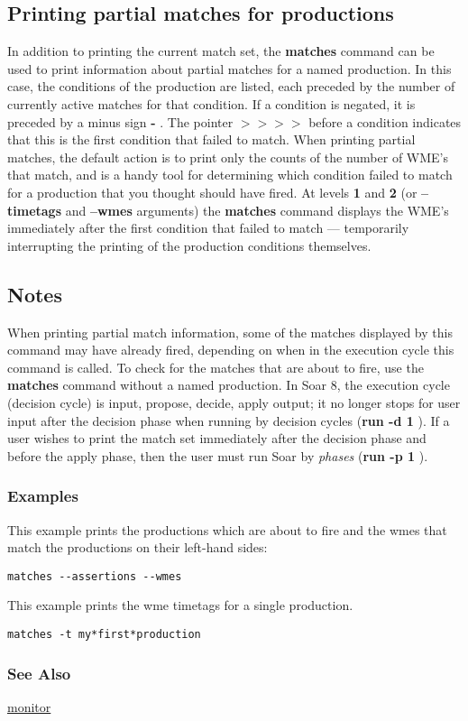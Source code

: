 \subsection*{Printing partial matches for productions}
 In addition to printing the current match set, the \textbf{matches}
 command can be used to print information about partial matches for a named production. In this case, the conditions of the production are listed, each preceded by the number of currently active matches for that condition. If a condition is negated, it is preceded by a minus sign \textbf{-}
. The pointer \textbf{$>$$>$$>$$>$}
 before a condition indicates that this is the first condition that failed to match. 
 When printing partial matches, the default action is to print only the counts of the number of WME's that match, and is a handy tool for determining which condition failed to match for a production that you thought should have fired. At levels \textbf{1}
 and \textbf{2}
 (or \textbf{--timetags}
 and \textbf{--wmes}
 arguments) the \textbf{matches}
 command displays the WME's immediately after the first condition that failed to match --- temporarily interrupting the printing of the production conditions themselves. 
\subsection*{Notes}
 When printing partial match information, some of the matches displayed by this command may have already fired, depending on when in the execution cycle this command is called. To check for the matches that are about to fire, use the \textbf{matches}
 command without a named production. 
 In Soar 8, the execution cycle (decision cycle) is input, propose, decide, apply output; it no longer stops for user input after the decision phase when running by decision cycles (\textbf{run -d 1}
). If a user wishes to print the match set immediately after the decision phase and before the apply phase, then the user must run Soar by \emph{phases}
 (\textbf{run -p 1}
). 
\subsubsection*{Examples}
 This example prints the productions which are about to fire and the wmes that match the productions on their left-hand sides: \begin{verbatim}
matches --assertions --wmes
\end{verbatim}
 This example prints the wme timetags for a single production. \begin{verbatim}
matches -t my*first*production
\end{verbatim}
\subsubsection*{See Also}
\hyperref[monitor]{monitor} 
